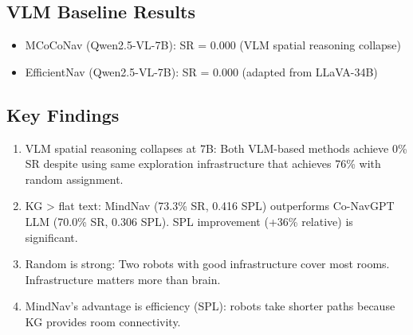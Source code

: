 \subsection{VLM Baseline Results}

\begin{itemize}
    \item MCoCoNav (Qwen2.5-VL-7B): SR = 0.000 (VLM spatial reasoning collapse)
    \item EfficientNav (Qwen2.5-VL-7B): SR = 0.000 (adapted from LLaVA-34B)
\end{itemize}

\subsection{Key Findings}

\begin{enumerate}
    \item VLM spatial reasoning collapses at 7B: Both VLM-based methods achieve 0\% SR despite using same exploration infrastructure that achieves 76\% with random assignment.
    \item KG > flat text: MindNav (73.3\% SR, 0.416 SPL) outperforms Co-NavGPT LLM (70.0\% SR, 0.306 SPL). SPL improvement (+36\% relative) is significant.
    \item Random is strong: Two robots with good infrastructure cover most rooms. Infrastructure matters more than brain.
    \item MindNav's advantage is efficiency (SPL): robots take shorter paths because KG provides room connectivity.
\end{enumerate}
